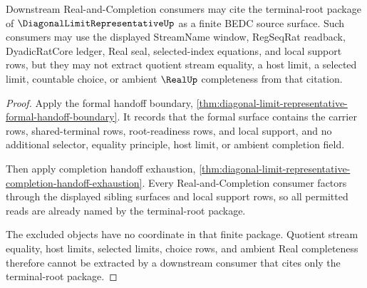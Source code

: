 \begin{theorem}
\label{thm:diagonal-limit-representative-completion-consumer-nonescape}
Downstream Real-and-Completion consumers may cite the terminal-root package of $\DiagonalLimitRepresentativeUp$ as a finite BEDC source surface. Such consumers may use the displayed StreamName window, RegSeqRat readback, DyadicRatCore ledger, Real seal, selected-index equations, and local support rows, but they may not extract quotient stream equality, a host limit, a selected limit, countable choice, or ambient $\RealUp$ completeness from that citation.
\end{theorem}
\begin{proof}
Apply the formal handoff boundary, \autoref{thm:diagonal-limit-representative-formal-handoff-boundary}. It records that the formal surface contains the carrier rows, shared-terminal rows, root-readiness rows, and local support, and no additional selector, equality principle, host limit, or ambient completion field.

Then apply completion handoff exhaustion, \autoref{thm:diagonal-limit-representative-completion-handoff-exhaustion}. Every Real-and-Completion consumer factors through the displayed sibling surfaces and local support rows, so all permitted reads are already named by the terminal-root package.

The excluded objects have no coordinate in that finite package. Quotient stream equality, host limits, selected limits, choice rows, and ambient Real completeness therefore cannot be extracted by a downstream consumer that cites only the terminal-root package.
\end{proof}
